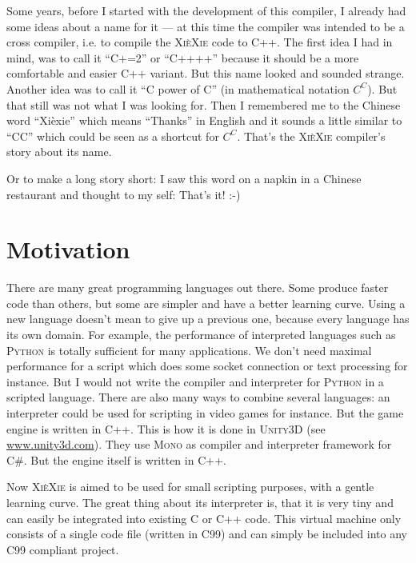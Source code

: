\documentclass[a5paper]{report}
\def\xiexie{\textsc{Xi\`eXie}\xspace}
\def\cpp{\textsc{C++}\xspace}
\def\python{\textsc{Python}\xspace}
\begin{document}
Some years, before I started with the development of this compiler, I already had some ideas about a name for it
--- at this time the compiler was intended to be a cross compiler, i.e. to compile the \xiexie code to \cpp.
The first idea I had in mind, was to call it ``C+=2'' or ``C++++'' because it should be a more comfortable and easier
\cpp variant. But this name looked and sounded strange. Another idea was to call it ``C power of C''
(in mathematical notation $C^C$). But that still was not what I was looking for.
Then I remembered me to the Chinese word ``Xi\`exie'' which means ``Thanks'' in English and it sounds a little
similar to ``CC'' which could be seen as a shortcut for $C^C$. That's the \xiexie compiler's story about its name.

Or to make a long story short: I saw this word on a napkin in a Chinese restaurant and thought to my self: That's it! :-)



\section{Motivation}

There are many great programming languages out there. Some produce faster code than others, but some
are simpler and have a better learning curve. Using a new language doesn't mean to give up a previous one,
because every language has its own domain. For example, the performance of interpreted languages such as \python
is totally sufficient for many applications. We don't need maximal performance for a script which does some
socket connection or text processing for instance.
But I would not write the compiler and interpreter for \python in a scripted language.
There are also many ways to combine several languages: an interpreter could be used for scripting in video games
for instance. But the game engine is written in \cpp.
This is how it is done in \textsc{Unity3D} (see \href{http://www.unity3d.com/}{www.unity3d.com}).
They use \textsc{Mono} as compiler and interpreter framework for \textsc{C\#}. But the engine itself is written in \cpp.

Now \xiexie is aimed to be used for small scripting purposes, with a gentle learning curve.
The great thing about its interpreter is, that it is very tiny and can easily be integrated into
existing \textsc{C} or \cpp code. This virtual machine only consists of a single code file (written in \textsc{C99})
and can simply be included into any \textsc{C99} compliant project.
\end{document}
